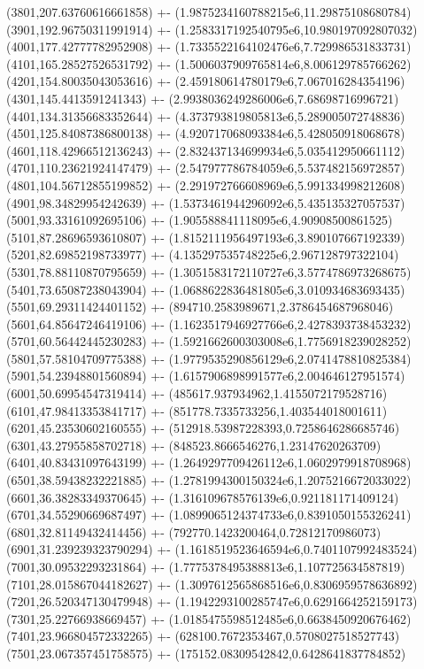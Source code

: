 {(3801,207.63760616661858) +- (1.9875234160788215e6,11.29875108680784)
(3901,192.96750311991914) +- (1.2583317192540795e6,10.980197092807032)
(4001,177.42777782952908) +- (1.7335522164102476e6,7.729986531833731)
(4101,165.28527526531792) +- (1.5006037909765814e6,8.006129785766262)
(4201,154.80035043053616) +- (2.459180614780179e6,7.067016284354196)
(4301,145.4413591241343) +- (2.9938036249286006e6,7.68698716996721)
(4401,134.31356683352644) +- (4.373793819805813e6,5.289005072748836)
(4501,125.84087386800138) +- (4.920717068093384e6,5.428050918068678)
(4601,118.42966512136243) +- (2.832437134699934e6,5.035412950661112)
(4701,110.23621924147479) +- (2.547977786784059e6,5.537482156972857)
(4801,104.56712855199852) +- (2.291972766608969e6,5.991334998212608)
(4901,98.34829954242639) +- (1.5373461944296092e6,5.435135327057537)
(5001,93.33161092695106) +- (1.905588841118095e6,4.90908500861525)
(5101,87.28696593610807) +- (1.8152111956497193e6,3.890107667192339)
(5201,82.69852198733977) +- (4.135297535748225e6,2.967128797322104)
(5301,78.88110870795659) +- (1.3051583172110727e6,3.5774786973268675)
(5401,73.65087238043904) +- (1.0688622836481805e6,3.010934683693435)
(5501,69.29311424401152) +- (894710.2583989671,2.3786454687968046)
(5601,64.85647246419106) +- (1.1623517946927766e6,2.4278393738453232)
(5701,60.56442445230283) +- (1.5921662600303008e6,1.7756918239028252)
(5801,57.58104709775388) +- (1.9779535290856129e6,2.0741478810825384)
(5901,54.23948801560894) +- (1.6157906898991577e6,2.004646127951574)
(6001,50.69954547319414) +- (485617.937934962,1.4155072179528716)
(6101,47.98413353841717) +- (851778.7335733256,1.403544018001611)
(6201,45.23530602160555) +- (512918.53987228393,0.7258646286685746)
(6301,43.27955858702718) +- (848523.8666546276,1.23147620263709)
(6401,40.83431097643199) +- (1.2649297709426112e6,1.0602979918708968)
(6501,38.59438232221885) +- (1.2781994300150324e6,1.2075216672033022)
(6601,36.38283349370645) +- (1.316109678576139e6,0.921181171409124)
(6701,34.55290669687497) +- (1.0899065124374733e6,0.8391050155326241)
(6801,32.81149432414456) +- (792770.1423200464,0.72812170986073)
(6901,31.239239323790294) +- (1.1618519523646594e6,0.7401107992483524)
(7001,30.09532293231864) +- (1.7775378495388813e6,1.107725634587819)
(7101,28.015867044182627) +- (1.3097612565868516e6,0.8306959578636892)
(7201,26.520347130479948) +- (1.1942293100285747e6,0.6291664252159173)
(7301,25.22766938669457) +- (1.0185475598512485e6,0.6638450920676462)
(7401,23.966804572332265) +- (628100.7672353467,0.5708027518527743)
(7501,23.067357451758575) +- (175152.08309542842,0.6428641837784852)
}
